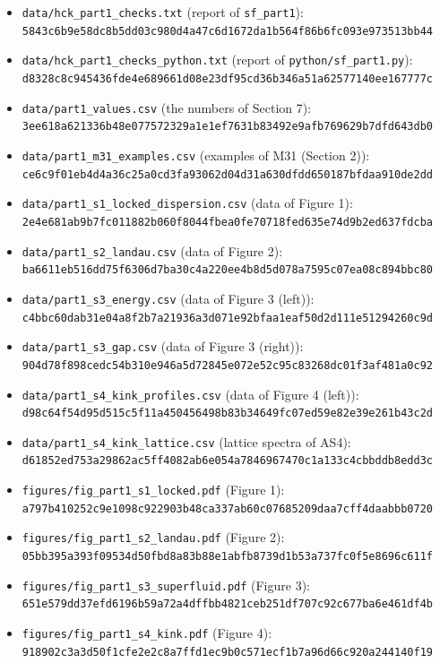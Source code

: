 \documentclass[
  10pt,
]{article}
\providecommand{\tightlist}{%
  \setlength{\itemsep}{0pt}\setlength{\parskip}{0pt}}
\begin{document}
\begin{itemize}
\tightlist
\item
  \texttt{data/hck\_part1\_checks.txt} (report of \texttt{sf\_part1}):\\
  \texttt{5843c6b9e58dc8b5dd03c980d4a47c6d1672da1b564f86b6fc093e973513bb44}
\item
  \texttt{data/hck\_part1\_checks\_python.txt} (report of
  \texttt{python/sf\_part1.py}):\\
  \texttt{d8328c8c945436fde4e689661d08e23df95cd36b346a51a62577140ee167777c}
\item
  \texttt{data/part1\_values.csv} (the numbers of Section 7):\\
  \texttt{3ee618a621336b48e077572329a1e1ef7631b83492e9afb769629b7dfd643db0}
\item
  \texttt{data/part1\_m31\_examples.csv} (examples of M31 (Section
  2)):\\
  \texttt{ce6c9f01eb4d4a36c25a0cd3fa93062d04d31a630dfdd650187bfdaa910de2dd}
\item
  \texttt{data/part1\_s1\_locked\_dispersion.csv} (data of Figure 1):\\
  \texttt{2e4e681ab9b7fc011882b060f8044fbea0fe70718fed635e74d9b2ed637fdcba}
\item
  \texttt{data/part1\_s2\_landau.csv} (data of Figure 2):\\
  \texttt{ba6611eb516dd75f6306d7ba30c4a220ee4b8d5d078a7595c07ea08c894bbc80}
\item
  \texttt{data/part1\_s3\_energy.csv} (data of Figure 3 (left)):\\
  \texttt{c4bbc60dab31e04a8f2b7a21936a3d071e92bfaa1eaf50d2d111e51294260c9d}
\item
  \texttt{data/part1\_s3\_gap.csv} (data of Figure 3 (right)):\\
  \texttt{904d78f898cedc54b310e946a5d72845e072e52c95c83268dc01f3af481a0c92}
\item
  \texttt{data/part1\_s4\_kink\_profiles.csv} (data of Figure 4
  (left)):\\
  \texttt{d98c64f54d95d515c5f11a450456498b83b34649fc07ed59e82e39e261b43c2d}
\item
  \texttt{data/part1\_s4\_kink\_lattice.csv} (lattice spectra of AS4):\\
  \texttt{d61852ed753a29862ac5ff4082ab6e054a7846967470c1a133c4cbbddb8edd3c}
\item
  \texttt{figures/fig\_part1\_s1\_locked.pdf} (Figure 1):\\
  \texttt{a797b410252c9e1098c922903b48ca337ab60c07685209daa7cff4daabbb0720}
\item
  \texttt{figures/fig\_part1\_s2\_landau.pdf} (Figure 2):\\
  \texttt{05bb395a393f09534d50fbd8a83b88e1abfb8739d1b53a737fc0f5e8696c611f}
\item
  \texttt{figures/fig\_part1\_s3\_superfluid.pdf} (Figure 3):\\
  \texttt{651e579dd37efd6196b59a72a4dffbb4821ceb251df707c92c677ba6e461df4b}
\item
  \texttt{figures/fig\_part1\_s4\_kink.pdf} (Figure 4):\\
  \texttt{918902c3a3d50f1cfe2e2c8a7ffd1ec9b0c571ecf1b7a96d66c920a244140f19}
\end{itemize}
\end{document}
